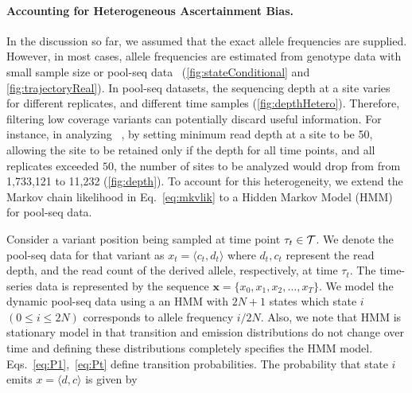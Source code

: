 \paragraph{Accounting for Heterogeneous Ascertainment Bias.}
In the discussion so far, we assumed that the exact allele frequencies
are supplied. However, in most cases, allele frequencies are estimated
from genotype data with small sample size or pool-seq
data~\cite{lynch2014population}
(\ref{fig:stateConditional} and 
\ref{fig:trajectoryReal}).
  In
pool-seq datasets, the sequencing depth at a site varies for different
replicates, and different time samples
(\ref{fig:depthHetero}). Therefore, filtering low 
coverage
variants can potentially discard useful information.  For instance, in
analyzing \datadm~\cite{orozco2012adaptation,franssen2015patterns}, by setting 
minimum read
depth at a site to be 50, allowing the site to be retained only if the
depth for all time points, and all replicates exceeded $50$, the
number of sites to be analyzed would drop from from 1,733,121 to
11,232 (\ref{fig:depth}). To account for this
heterogeneity, we extend the Markov chain likelihood in
Eq.~\ref{eq:mkvlik} to a Hidden Markov Model (HMM) for pool-seq data.

Consider a variant position being sampled at time point $\tau_t\in
{\cal T}$. We denote the pool-seq data for that variant as $x_t =
\langle c_t,d_t \rangle$ where $d_t, c_t$ represent the read depth,
and the read count of the derived allele, respectively, at time
$\tau_t$. The time-series data is represented by the sequence
$\bm{x}=\{x_0,x_1,x_2,\ldots,x_T\}$. We model the dynamic pool-seq
data using a an HMM with $2N+1$ states which state $i$ $(0\le i\le
2N)$ corresponds to allele frequency $i/2N$.  Also, we note that HMM
is stationary model in that transition and emission distributions do
not change over time and defining these distributions completely
specifies the HMM model. Eqs.~\ref{eq:P1},~\ref{eq:Pt} define
transition probabilities. The probability that state $i$ emits $
x=\langle d, c\rangle $ is given by

